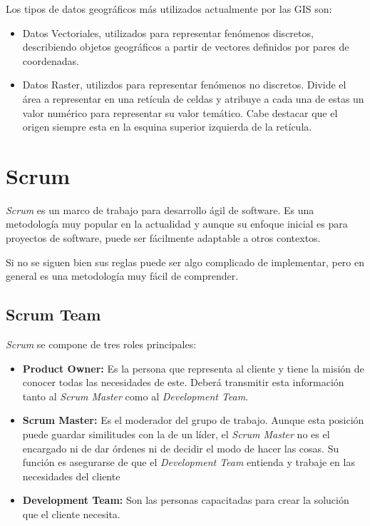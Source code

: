 Los tipos de datos geográficos más utilizados actualmente por las GIS son:
\begin{itemize}
\item Datos Vectoriales, utilizados para representar fenómenos discretos, describiendo objetos geográficos a partir de vectores definidos por pares de coordenadas.
\item Datos Raster, utilizdos para representar fenómenos no discretos. Divide el área a representar en una retícula de celdas y atribuye a cada una de estas un valor numérico para representar su valor temático. Cabe destacar que el origen siempre esta en la esquina superior izquierda de la retícula.
\end{itemize}

\section{Scrum}
\textit{Scrum} es un marco de trabajo para desarrollo ágil de software.\cite{wiki:scrum}
Es una metodología muy popular en la actualidad y aunque su enfoque inicial es para proyectos de software, puede ser fácilmente adaptable a otros contextos.

Si no se siguen bien sus reglas puede ser algo complicado de implementar, pero en general es una metodología muy fácil de comprender.

\subsection{Scrum Team}
\textit{Scrum} se compone de tres roles principales:
\begin{itemize}
\item \textbf{Product Owner: }Es la persona que representa al cliente y tiene la misión de conocer todas las necesidades de este. Deberá transmitir esta información tanto al \textit{Scrum Master} como al \textit{Development Team}.
\item \textbf{Scrum Master: }Es el moderador del grupo de trabajo. Aunque esta posición puede guardar similitudes con la de un líder, el \textit{Scrum Master} no es el encargado ni de dar órdenes ni de decidir el modo de hacer las cosas. Su función es asegurarse de que el \textit{Development Team} entienda y trabaje en las necesidades del cliente
\item \textbf{Development Team: }Son las personas capacitadas para crear la solución que el cliente necesita.
\end{itemize}

